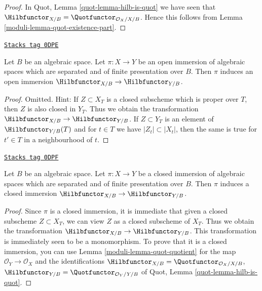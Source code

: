 \begin{proof}

In Quot, Lemma \ref{quot-lemma-hilb-is-quot} we have seen that
$\Hilbfunctor_{X/B} = \Quotfunctor_{\mathcal{O}_X/X/B}$.
Hence this follows from Lemma \ref{moduli-lemma-quot-existence-part}.
\end{proof}

\begin{lemma}
\label{moduli-lemma-hilb-open}
\href{https://stacks.math.columbia.edu/tag/0DPE}{\texttt{Stacks tag 0DPE}}

Let $B$ be an algebraic space. Let $\pi : X \to Y$ be an open immersion
of algebraic spaces which are separated and of finite presentation over $B$.
Then $\pi$ induces an open immersion
$\Hilbfunctor_{X/B} \to \Hilbfunctor_{Y/B}$.
\end{lemma}

\begin{proof}
Omitted. Hint: If $Z \subset X_T$ is a closed subscheme which is
proper over $T$, then $Z$ is also closed in $Y_T$. Thus we obtain
the transformation $\Hilbfunctor_{X/B} \to \Hilbfunctor_{Y/B}$.
If $Z \subset Y_T$ is an element of $\Hilbfunctor_{Y/B}(T)$
and for $t \in T$ we have $|Z_t| \subset |X_t|$,
then the same is true for $t' \in T$ in a neighbourhood of $t$.
\end{proof}

\begin{lemma}
\label{moduli-lemma-hilb-closed}
\href{https://stacks.math.columbia.edu/tag/0DPF}{\texttt{Stacks tag 0DPF}}

Let $B$ be an algebraic space. Let $\pi : X \to Y$ be a closed immersion
of algebraic spaces which are separated and of finite presentation
over $B$. Then $\pi$ induces a closed immersion
$\Hilbfunctor_{X/B} \to \Hilbfunctor_{Y/B}$.
\end{lemma}

\begin{proof}

Since $\pi$ is a closed immersion, it is immediate that given a
closed subscheme $Z \subset X_T$,
we can view $Z$ as a closed subscheme of $X_T$. Thus we obtain
the transformation $\Hilbfunctor_{X/B} \to \Hilbfunctor_{Y/B}$.
This transformation is immediately seen to be a monomorphism.
To prove that it is a closed immersion, you can use
Lemma \ref{moduli-lemma-quot-quotient} for the map
$\mathcal{O}_Y \to \mathcal{O}_X$ and the identifications
$\Hilbfunctor_{X/B} = \Quotfunctor_{\mathcal{O}_X/X/B}$,
$\Hilbfunctor_{Y/B} = \Quotfunctor_{\mathcal{O}_Y/Y/B}$
of Quot, Lemma \ref{quot-lemma-hilb-is-quot}.
\end{proof}

